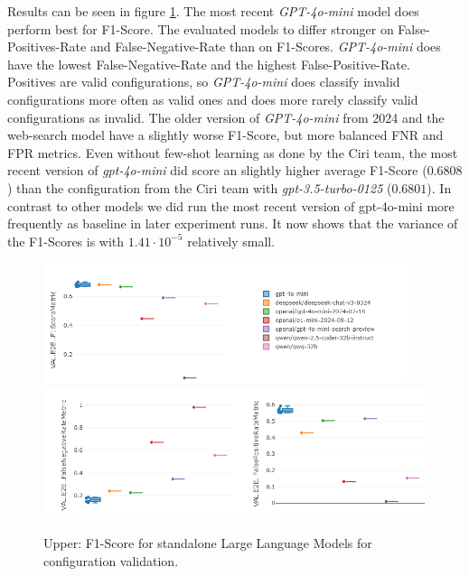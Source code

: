 Results can be seen in figure \ref{fig:LLMStandalone-Results}. The most recent \textit{GPT-4o-mini} model does perform best for F1-Score. The evaluated models to differ stronger on False-Positives-Rate and False-Negative-Rate than on F1-Scores. \textit{GPT-4o-mini} does have the lowest False-Negative-Rate and the highest False-Positive-Rate. Positives are valid configurations, so \textit{GPT-4o-mini} does classify invalid configurations more often as valid ones and does more rarely classify valid configurations as invalid. The older version of \textit{GPT-4o-mini} from 2024 and the web-search model have a slightly worse F1-Score, but more balanced FNR and FPR metrics. Even without few-shot learning as done by the Ciri team, the most recent version of \textit{gpt-4o-mini} did score an slightly higher average F1-Score ($0.6808$) than the configuration from the Ciri team with \textit{gpt-3.5-turbo-0125} ($0.6801$). In contrast to other models we did run the most recent version of gpt-4o-mini more frequently as baseline in later experiment runs. It now shows that the variance of the F1-Scores is with $1.41 \cdot 10^{-5}$ relatively small. 


\begin{figure}[h]
    \centering
    \includegraphics[width=0.95\textwidth]{images/LLMStandalone-by-model.png}\\[6pt]
    \includegraphics[width=\textwidth]{images/LLMStandalone-by-model-FNRFPR.png}
    \caption{Upper: F1-Score for standalone Large Language Models for configuration validation. }
    \label{fig:LLMStandalone-Results}
  \end{figure}

